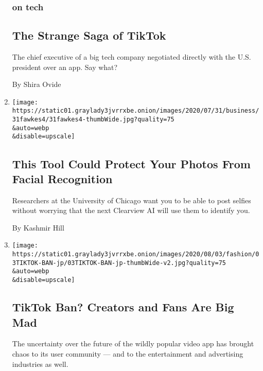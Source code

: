 \begin{enumerate}
{  \subsubsection{on tech}\label{on-tech}}

  \hypertarget{the-strange-saga-of-tiktok}{%
  \subsection{The Strange Saga of
  TikTok}\label{the-strange-saga-of-tiktok}}

  The chief executive of a big tech company negotiated directly with the
  U.S. president over an app. Say what?

  By Shira Ovide
\item
  \href{/2020/08/03/technology/fawkes-tool-protects-photos-from-facial-recognition.html}{}

  \texttt{[image: https://static01.graylady3jvrrxbe.onion/images/2020/07/31/business/31fawkes4/31fawkes4-thumbWide.jpg?quality=75\\\&auto=webp\\\&disable=upscale]}

  \hypertarget{this-tool-could-protect-your-photos-from-facial-recognition}{%
  \subsection{This Tool Could Protect Your Photos From Facial
  Recognition}\label{this-tool-could-protect-your-photos-from-facial-recognition}}

  Researchers at the University of Chicago want you to be able to post
  selfies without worrying that the next Clearview AI will use them to
  identify you.

  By Kashmir Hill
\item
  \href{/2020/08/02/style/tiktok-ban-threat-trump.html}{}

  \texttt{[image: https://static01.graylady3jvrrxbe.onion/images/2020/08/03/fashion/03TIKTOK-BAN-jp/03TIKTOK-BAN-jp-thumbWide-v2.jpg?quality=75\\\&auto=webp\\\&disable=upscale]}

  \hypertarget{tiktok-ban-creators-and-fans-are-big-mad}{%
  \subsection{TikTok Ban? Creators and Fans Are Big
  Mad}\label{tiktok-ban-creators-and-fans-are-big-mad}}

  The uncertainty over the future of the wildly popular video app has
  brought chaos to its user community --- and to the entertainment and
  advertising industries as well.


\end{enumerate}
